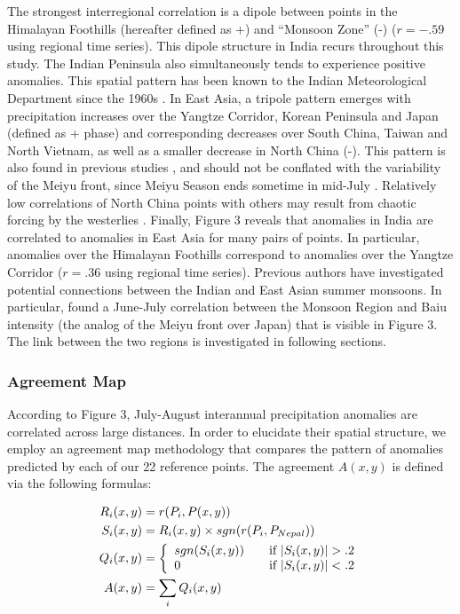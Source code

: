 \documentclass[12pt]{article}
\begin{document}
	 The strongest interregional correlation is a dipole between points in the Himalayan Foothills (hereafter defined as +) and ``Monsoon Zone'' (-) ($r=-.59$ using regional time series). This dipole structure in India recurs throughout this study. The Indian Peninsula also simultaneously tends to experience positive anomalies. This spatial pattern has been known to the Indian Meteorological Department since the 1960s \citep{Krishnamurthy2000}. In East Asia, a tripole pattern emerges with precipitation increases over the Yangtze Corridor, Korean Peninsula and Japan (defined as + phase) and corresponding decreases over South China, Taiwan and North Vietnam, as well as a smaller decrease in North China (-). This pattern is also found in previous studies \citep{Ding2008}, and should not be conflated with the variability of the Meiyu front, since Meiyu Season ends sometime in mid-July \cite{Wang2002}. Relatively low correlations of North China points with others may result from chaotic forcing by the westerlies \citep{Kosaka2012}. Finally, Figure 3 reveals that anomalies in India are correlated to anomalies in East Asia for many pairs of points. In particular, anomalies over the Himalayan Foothills correspond to anomalies over the Yangtze Corridor ($r=.36$ using regional time series). Previous authors have investigated potential connections between the Indian and East Asian summer monsoons\citep{Lau2000}\citep{Liu2008}. In particular, \cite{Krishnan2001} found a June-July correlation between the Monsoon Region and Baiu intensity (the analog of the Meiyu front over Japan) that is visible in Figure 3. The link between the two regions is investigated in following sections.
		
\subsubsection{Agreement Map}

	According to Figure 3, July-August interannual precipitation anomalies are correlated across large distances. In order to elucidate their spatial structure, we employ an agreement map methodology that compares the pattern of anomalies predicted by each of our 22 reference points. The agreement $A(x,y)$ is defined via the following formulas:
	
	\begin{align*}
	R_i(x,y)& = r(P_i,P(x,y)) \\
	S_i(x,y)& = R_i(x,y) \times sgn(r(P_i,P_{Nepal})) \\
	Q_i(x,y)& = \left\{
		\begin{array}{l l}
	 		sgn(S_i(x,y)) & \quad \text{if $|S_i(x,y)|>.2$} \\
	 		0 & \quad \text{if $|S_i(x,y)|<.2$}
	 	\end{array} \right. \\
	A(x,y)& = \sum_{i}Q_i(x,y)
	\end{align*}	
\end{document}

